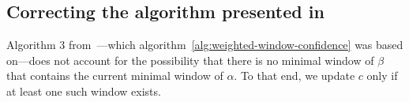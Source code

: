 \subsection{Correcting the algorithm presented in~\citep{cule2014marbles}}

Algorithm 3 from~\citep{cule2014marbles}---which algorithm~\ref{alg:weighted-window-confidence} was based on---does not account for the possibility that there is no minimal window of $ \beta $ that contains the current minimal window of $ \alpha $. To that end, we update $ c $ only if at least one such window exists.
